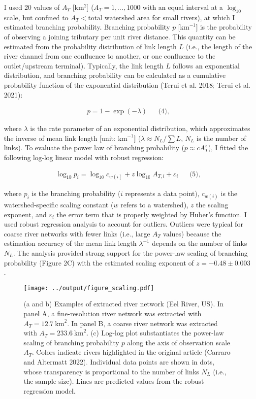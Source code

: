 \documentclass[
  12pt,
]{article}
\begin{document}
I used \(20\) values of \(A_T\) {[}km\(^2\){]} (\(A_T=1,...,1000\) with an equal interval at a \(\log_{10}\) scale, but confined to \(A_T < \text{total watershed area}\) for small rivers), at which I estimated branching probability. Branching probability \(p\) {[}\(\text{km}^{-1}\){]} is the probability of observing a joining tributary per unit river distance. This quantity can be estimated from the probability distribution of link length \(L\) (i.e., the length of the river channel from one confluence to another, or one confluence to the outlet/upstream terminal). Typically, the link length \(L\) follows an exponential distribution, and branching probability can be calculated as a cumulative probability function of the exponential distribution (Terui et al. 2018; Terui et al. 2021):

\[
\begin{aligned}
p = 1 - \exp(-\lambda)  &&\text{(4),}
\end{aligned}
\]

where \(\lambda\) is the rate parameter of an exponential distribution, which approximates the inverse of mean link length {[}unit: \(\text{km}^{-1}\){]} (\(\lambda \approx N_L / \sum L\), \(N_L\) is the number of links). To evaluate the power law of branching probability (\(p \approx cA_T^z\)), I fitted the following log-log linear model with robust regression:

\[
\begin{aligned}
\log_{10} p_{i} = \log_{10} c_{w(i)} + z\log_{10} A_{T,i} + \varepsilon_{i}  &&\text{(5),}
\end{aligned}
\]

where \(p_i\) is the branching probability (\(i\) represents a data point), \(c_{w(i)}\) is the watershed-specific scaling constant (\(w\) refers to a watershed), \(z\) the scaling exponent, and \(\varepsilon_i\) the error term that is properly weighted by Huber's function. I used robust regression analysis to account for outliers. Outliers were typical for coarse river networks with fewer links (i.e., large \(A_T\) values) because the estimation accuracy of the mean link length \(\lambda^{-1}\) depends on the number of links \(N_L\). The analysis provided strong support for the power-law scaling of branching probability (Figure 2C) with the estimated scaling exponent of \(z = -0.48 \pm 0.003\).

\begin{figure}
\centering
\texttt{[image: ../output/figure\_scaling.pdf]}
\caption{\label{fig:fig-pr}(a and b) Examples of extracted river network (Eel River, US). In panel A, a fine-resolution river network was extracted with \(A_T = 12.7~\text{km}^2\). In panel B, a coarse river network was extracted with \(A_T = 233.6~\text{km}^2\). (c) Log-log plot substantiates the power-law scaling of branching probability \(p\) along the axis of observation scale \(A_T\). Colors indicate rivers highlighted in the original article (Carraro and Altermatt 2022). Individual data points are shown in dots, whose transparency is proportional to the number of links \(N_L\) (i.e., the sample size). Lines are predicted values from the robust regression model.}
\end{figure}
\end{document}

